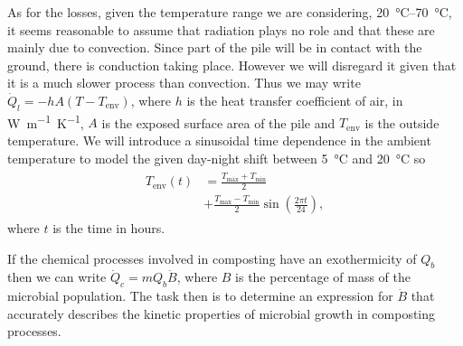 \documentclass[12pt, a4paper, twocolumn, twoside]{article}
\numberwithin{table}{section}
\numberwithin{figure}{section}
\numberwithin{equation}{section}
\begin{document}
As for the losses, given the temperature range we are considering, \SIrange{20}{70}{\celsius}, it seems reasonable to assume that radiation plays no role and that these are mainly due to convection. Since part of the pile will be in contact with the ground, there is conduction taking place. However we will disregard it given that it is a much slower process than convection.  Thus we may write \( \dot{Q}_l = -hA\left(T - T_\text{env}\right) \), where \( h \) is the heat transfer coefficient of air, in \si{W.m^{-1}.K^{-1}}, \( A \) is the exposed surface area of the pile and \( T_\text{env} \) is the outside temperature. We will introduce a sinusoidal time dependence in the ambient temperature to model the given day-night shift between \SI{5}{\celsius} and \SI{20}{\celsius} so 
\begin{align} \label{eq:temp ambient}
	\begin{aligned}
		T_\text{env}(t)  & = \frac{T_\text{max} + T_\text{min}}{2} \\
									 	 & + \frac{T_\text{max} - T_\text{min}}{2} \sin{\left(\frac{2\pi t}{24}\right)},
	\end{aligned}
\end{align}
where \( t \) is the time in hours. 

If the chemical processes involved in composting have an exothermicity of \( Q_b \) then we can write	\( \dot{Q}_c = mQ_b \dot{B} \), where \( B \) is the percentage of mass of the microbial population. The task then is to determine an expression for \( \dot{B} \) that accurately describes the kinetic properties of microbial growth in composting processes.
\end{document}
